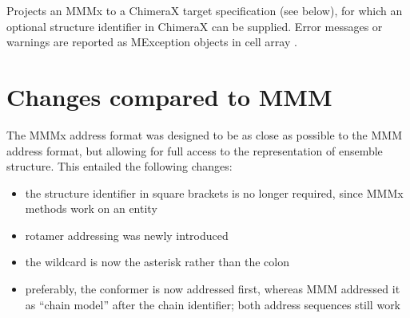 \documentclass[letterpaper,10pt,english]{sphinxmanual}
\begin{document}
\begin{sphinxVerbatim}[commandchars=\\\{\}]
\PYG{p}{[}\PYG{p}{]}  
\end{sphinxVerbatim}

Projects an MMMx  to a ChimeraX target specification  (see below), for which an optional structure identifier  in ChimeraX can be supplied.
Error messages or warnings are reported as MException objects in cell array .


\section{Changes compared to MMM}
\label{\detokenize{MMMx_addresses:changes-compared-to-mmm}}
The MMMx address format was designed to be as close as possible to the MMM address format, but allowing for full access to the  representation of ensemble structure.
This entailed the following changes:
\begin{itemize}
\item {} 
the structure identifier in square brackets is no longer required, since MMMx methods work on an entity

\item {} 
rotamer addressing was newly introduced

\item {} 
the wildcard is now the asterisk \sphinxcode{\sphinxupquote{*}} rather than the colon \sphinxcode{\sphinxupquote{:}}

\item {} 
preferably, the conformer is now addressed first, whereas MMM addressed it as “chain model” after the chain identifier; both address sequences still work

\end{itemize}
\end{document}
